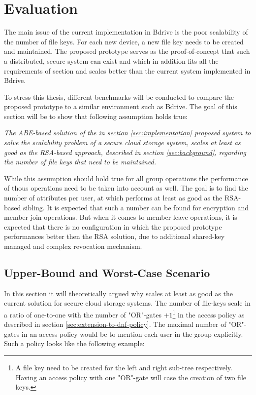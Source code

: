 \chapter{Evaluation}

The main issue of the current implementation in Bdrive is the poor scalability of the number of file keys. For each new device, a new file key needs to be created and maintained. The proposed prototype serves as the proof-of-concept that such a distributed, secure system can exist and which in addition fits all the requirements of section  and scales better than the current system implemented in Bdrive. 

To stress this thesis, different benchmarks will be conducted to compare the proposed prototype to a similar environment such as Bdrive. The goal of this section will be to show that following assumption holds true:

\begin{center}
\textit{The ABE-based solution of the in section \ref{sec:implementation} proposed system to solve the scalability problem of a secure cloud storage system, scales at least as good as the RSA-based approach, described in section \ref{sec:background}, regarding the number of file keys that need to be maintained.}
\end{center}

While this assumption should hold true for all group operations the performance of thous operations need to be taken into account as well. The goal is to find the number of attributes per user, at which \name performs at least as good as the RSA-based sibling. It is expected that such a number can be found for encryption and member join operations. But when it comes to member leave operations, it is expected that there is no configuration in which the proposed prototype performances better then the RSA solution, due to additional shared-key managed and complex revocation mechanism. 

\section{Upper-Bound and Worst-Case Scenario}
\label{sec:upper-bound-and-worst-case-scenario}
In this section it will theoretically argued why \name scales at least as good as the current solution for secure cloud storage systems. The number of file-keys scale in a ratio of one-to-one with the number of "OR"-gates $+ 1$\footnote{A file key need to be created for the left and right sub-tree respectively. Having an access policy with one "OR"-gate will case the creation of two file keys.} in the access policy as described in section  \ref{sec:extension-to-dnf-policy}. The maximal number of "OR"-gates in an access policy would be to mention each user in the group explicitly. Such a policy looks like the following example:

